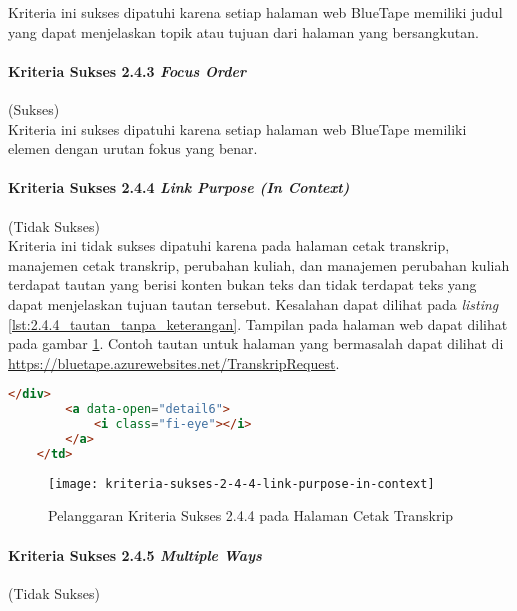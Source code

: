 Kriteria ini sukses dipatuhi karena setiap halaman web BlueTape memiliki judul yang dapat menjelaskan topik atau tujuan dari halaman yang bersangkutan.

\paragraph{Kriteria Sukses 2.4.3 \textit{Focus Order}}
\label{par:kepatuhan_bluetape_kriteria_sukses_2.4.3}
(Sukses)\\

Kriteria ini sukses dipatuhi karena setiap halaman web BlueTape memiliki elemen dengan urutan fokus yang benar. 

\paragraph{Kriteria Sukses 2.4.4 \textit{Link Purpose (In Context)}}
\label{par:kepatuhan_bluetape_kriteria_sukses_2.4.4}
(Tidak Sukses)\\

Kriteria ini tidak sukses dipatuhi karena pada halaman cetak transkrip, manajemen cetak transkrip, perubahan kuliah, dan manajemen perubahan kuliah terdapat tautan yang berisi konten bukan teks dan tidak terdapat teks yang dapat menjelaskan tujuan tautan tersebut. Kesalahan dapat dilihat pada \textit{listing} \ref{lst:2.4.4_tautan_tanpa_keterangan}. Tampilan pada halaman web dapat dilihat pada gambar \ref{fig:2.4.4_link_purpose_in_context}. Contoh tautan untuk halaman yang bermasalah dapat dilihat di \url{https://bluetape.azurewebsites.net/TranskripRequest}.

\begin{lstlisting}[frame=single, label={lst:2.4.4_tautan_tanpa_keterangan}, language=HTML, caption=Pelanggaran Kriteria Sukses 2.4.4 pada Halaman Cetak Transkrip]
        </div>
        <a data-open="detail6">
            <i class="fi-eye"></i>
        </a>
    </td>
\end{lstlisting}

\begin{figure}[H]
    \centering  
    \texttt{[image: kriteria-sukses-2-4-4-link-purpose-in-context]}  
    \caption[Pelanggaran Kriteria Sukses 2.4.4 pada Halaman Cetak Transkrip]{Pelanggaran Kriteria Sukses 2.4.4 pada Halaman Cetak Transkrip}
    \label{fig:2.4.4_link_purpose_in_context}  
\end{figure} 

\paragraph{Kriteria Sukses 2.4.5 \textit{Multiple Ways}}
\label{par:kepatuhan_bluetape_kriteria_sukses_2.4.5}
(Tidak Sukses)\\

